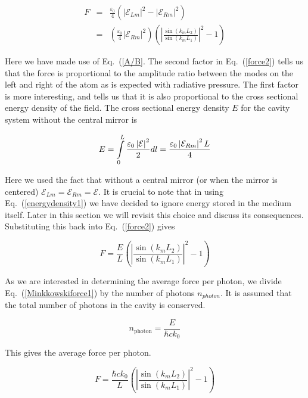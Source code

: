 \documentclass[twocolumn,english,pra,aps,superscriptaddress,floatfix]{revtex4-1}
\begin{document}
\begin{eqnarray}
F&=&\frac{\varepsilon_{0}}{4}\left(\left|\mathcal{E}_{Lm}\right|^{2}-\left|\mathcal{E}_{Rm}\right|^{2}\right)\nonumber \\ &=&\left(\frac{\varepsilon_{0}}{4}\left|\mathcal{E}_{Rm}\right|^{2}\right)\left(\left|\frac{\sin(k_{m}L_{2})}{\sin(k_{m}L_{1})}\right|^{2}-1\right)
\label{force2}
\end{eqnarray}

Here we have made use of Eq.\ (\ref{A/B}. The second factor in Eq.\ (\ref{force2}) tells us that the force is proportional to the amplitude ratio between the modes on the left and right of the atom as is expected with radiative pressure. The first factor is more interesting, and tells us that it is also proportional to the cross sectional energy density of the field. The cross sectional energy density $E$ for the cavity system without the central mirror is

\begin{equation}
E=\intop_{0}^{L}\frac{\varepsilon_{0}\left|\mathcal{E}\right|^{2}}{2}dl=\frac{\varepsilon_{0}\left|\mathcal{E}_{Rm}\right|^{2}L}{4}
\label{energydensity1}
\end{equation}
 
Here we used the fact that without a central mirror (or when the mirror is centered) $\mathcal{E}_{Lm}=\mathcal{E}_{Rm}=\mathcal{E}$. It is crucial to note that in using Eq.\ (\ref{energydensity1}) we have decided to ignore energy stored in the medium itself.  Later in this section we will revisit this choice and discuss its consequences.  
Substituting this back into Eq.\ (\ref{force2}) gives

\begin{equation}
F=\frac{E}{L}\left(\left|\frac{\sin(k_{m}L_{2})}{\sin(k_{m}L_{1})}\right|^{2}-1\right)
\label{Minkkowskiforce1}
\end{equation}

As we are interested in determining the average force per photon, we divide Eq.\ (\ref{Minkkowskiforce1}) by the number of photons $n_{photon}$.  It is assumed that the total number of photons in the cavity is conserved.  

\begin{equation}
n_{\mathrm{photon}}=\frac{E}{\hbar ck_0}
\label{photonnumber}
\end{equation}

This gives the average force per photon.

\begin{equation}
F=\frac{\hbar ck_0}{L}\left(\left|\frac{\sin(k_{m}L_{2})}{\sin(k_{m}L_{1})}\right|^{2}-1\right)
\label{Minkowskiforce2}
\end{equation}
\end{document}
